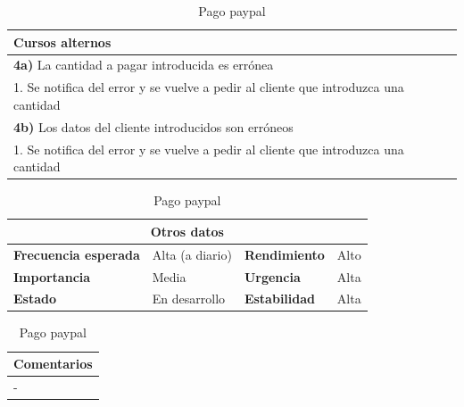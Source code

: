 \documentclass[12pt,spanish]{article}
\begin{document}
\begin{table}[H]
\vspace{1cm}

\begin{tabular}{|m{10pt}|m{7.15cm}|m{10pt}|m{7.15cm}|}
\hline
\multicolumn{4}{|m{16.2cm}|}{\textbf{Cursos alternos}} \\
\hline
\multicolumn{4}{|m{16.2cm}|}{\textbf{4a)} La cantidad a pagar introducida es errónea} \\
\hline
\multicolumn{4}{|m{16.2cm}|}{1. Se notifica del error y se vuelve a pedir al cliente que introduzca una cantidad}\\
\hline
\multicolumn{4}{|m{16.2cm}|}{\textbf{4b)} Los datos del cliente introducidos son erróneos} \\
\hline
\multicolumn{4}{|m{16.2cm}|}{1. Se notifica del error y se vuelve a pedir al cliente que introduzca una cantidad}\\
\hline
\end{tabular}

\vspace{1cm}

\begin{tabular}{|m{3.72cm}|m{3.72cm}|m{3.72cm}|m{3.72cm}|}
\hline
\multicolumn{4}{|c|}{\textbf{Otros datos}} \\
\hline
\textbf{Frecuencia esperada} & Alta (a diario) & \textbf{Rendimiento} & Alto \\
\hline
\textbf{Importancia} & Media & \textbf{Urgencia} & Alta \\
\hline
\textbf{Estado} & En desarrollo & \textbf{Estabilidad} & Alta \\
\hline
\end{tabular}

\vspace{1cm}

\begin{tabular}{|m{16.2cm}|}
\hline
\textbf{Comentarios} \\
\hline
- \\
\hline
\end{tabular}

\caption{Pago paypal}

\end{table}


\end{document}
